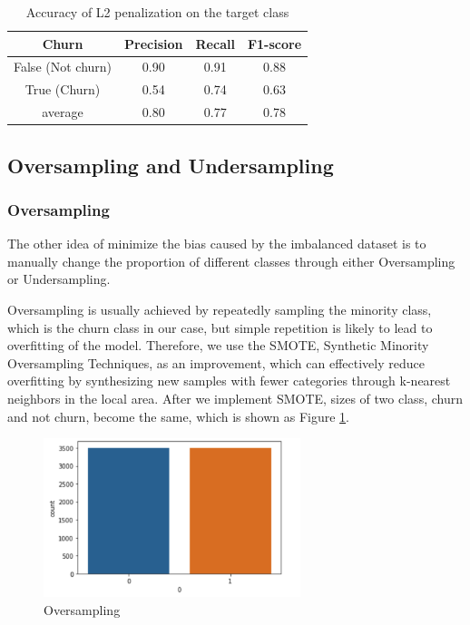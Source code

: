 \documentclass{article}
\begin{document}
\FloatBarrier
\begin{table}[htb]
\centering
\caption{Accuracy of L2 penalization on the target class}
	\begin{tabular}{||c c c c ||} 
	 \hline
 	Churn & Precision & Recall & F1-score  \\ [0.5ex] 
 	\hline\hline
 	False (Not churn) & 0.90 & 0.91 & 0.88 \\ 
 	True (Churn) & 0.54 & 0.74 & 0.63 \\
   	average & 0.80 & 0.77 & 0.78 \\
 	\hline
	\end{tabular}
\label{penalty}
\end{table}
\FloatBarrier
\subsection{Oversampling and Undersampling}
\subsubsection{Oversampling}
The other idea of minimize the bias caused by the imbalanced dataset is to manually change the proportion of different classes through either Oversampling or Undersampling. 
\vspace{5.5pt}

\noindent Oversampling is usually achieved by repeatedly sampling the minority class, which is the churn class in our case, but simple repetition is likely to lead to overfitting of the model. Therefore, we use the SMOTE, Synthetic Minority Oversampling Techniques, as an improvement, which can effectively reduce overfitting by synthesizing new samples with fewer categories through k-nearest neighbors in the local area. After we implement SMOTE, sizes of two class, churn and not churn, become the same, which is shown as Figure \ref{fig:oversampling}.
\FloatBarrier
\begin{figure}[htb]
    \centering
    \includegraphics[width=7.5cm]{Oversampling}
    \caption{Oversampling}
    \label{fig:oversampling}
\end{figure}
\FloatBarrier
\end{document}
